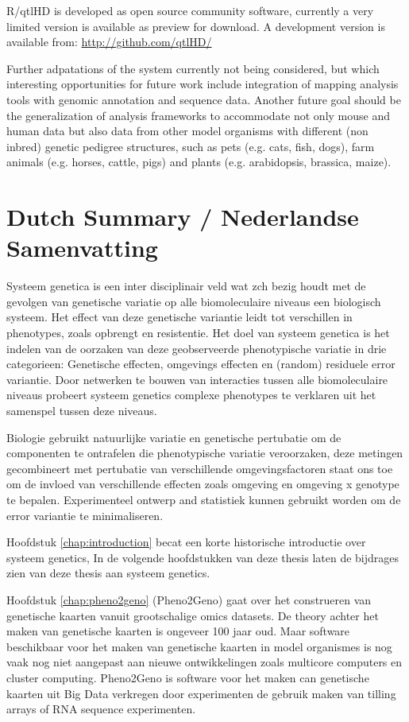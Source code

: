 R/qtlHD is developed as open source community software, currently a very limited version 
is available as preview for download. A development version is available from: 
\url{http://github.com/qtlHD/}

Further adpatations of the system currently not being considered, but which interesting opportunities for future work include 
integration of mapping analysis tools with genomic annotation and sequence data. Another future goal should be 
the generalization of analysis frameworks to accommodate not only mouse and human data but also data from other 
model organisms with different (non inbred) genetic pedigree structures, such as pets (e.g. cats, fish, dogs), 
farm animals (e.g. horses, cattle, pigs) and plants (e.g. arabidopsis, brassica, maize).

\newpage

\section{Dutch Summary / Nederlandse Samenvatting}
Systeem genetica is een inter disciplinair veld wat zch bezig houdt met de gevolgen van 
genetische variatie op alle biomoleculaire niveaus een biologisch systeem. Het effect van 
deze genetische variantie leidt tot verschillen in phenotypes, zoals opbrengt en resistentie. 
Het doel van systeem genetica is het indelen van de oorzaken van deze geobserveerde 
phenotypische variatie in drie categorieen: Genetische effecten, omgevings effecten en 
(random) residuele error variantie. Door netwerken te bouwen van interacties tussen 
alle biomoleculaire niveaus probeert systeem genetics complexe phenotypes te verklaren uit 
het samenspel tussen deze niveaus.

Biologie gebruikt natuurlijke variatie en genetische pertubatie om de componenten te ontrafelen
die phenotypische variatie veroorzaken, deze metingen gecombineert met pertubatie van verschillende 
omgevingsfactoren staat ons toe om de invloed van verschillende effecten zoals omgeving en 
omgeving x genotype te bepalen. Experimenteel ontwerp and statistiek kunnen gebruikt worden om 
de error variantie te minimaliseren.

Hoofdstuk \ref{chap:introduction} becat een korte historische introductie over systeem genetics, 
In de volgende hoofdstukken van deze thesis laten de bijdrages zien van deze thesis aan systeem genetics.

Hoofdstuk \ref{chap:pheno2geno} (Pheno2Geno) gaat over het construeren van genetische kaarten vanuit grootschalige 
omics datasets. De theory achter het maken van genetische kaarten is ongeveer 100 jaar oud. Maar 
software beschikbaar voor het maken van genetische kaarten in model organismes is nog 
vaak nog niet aangepast aan nieuwe ontwikkelingen zoals multicore computers en cluster computing. 
Pheno2Geno is software voor het maken can genetische kaarten uit Big Data verkregen door 
experimenten de gebruik maken van tilling arrays of RNA sequence experimenten.

